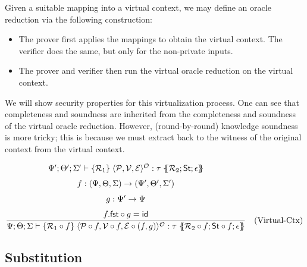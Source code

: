 \begin{definition}
    \label{def:virtual_oracle_reduction}
    Given a suitable mapping into a virtual context, we may define an oracle reduction via the following construction:
    \begin{itemize}
        \item The prover first applies the mappings to obtain the virtual context. The verifier does the same, but only for the non-private inputs.
        \item The prover and verifier then run the virtual oracle reduction on the virtual context.
    \end{itemize}
\end{definition}

We will show security properties for this virtualization process. One can see that completeness and soundness are inherited from the completeness and soundness of the virtual oracle reduction. However, (round-by-round) knowledge soundness is more tricky; this is because we must extract back to the witness of the original context from the virtual context.


\[
\frac{%
  \begin{array}{c}
    \Psi'; \Theta'; \Sigma' \vdash \{\mathcal{R}_1\} \; \langle\mathcal{P}, \mathcal{V}, \mathcal{E}\rangle^{\mathcal{O}} : \tau \; \{\!\!\{\mathcal{R}_2; \mathsf{St}; \epsilon\}\!\!\} \\[1.5ex]
    f : (\Psi, \Theta, \Sigma) \to (\Psi', \Theta', \Sigma') \\[1.5ex]
    g : \Psi' \to \Psi \\[1.5ex]
    f.\mathsf{fst} \circ g = \mathsf{id}
  \end{array}%
}{%
  \Psi; \Theta; \Sigma \vdash \{\mathcal{R}_1 \circ f\} \; \langle\mathcal{P} \circ f, \mathcal{V} \circ f, \mathcal{E} \circ (f, g)\rangle^{\mathcal{O}} : \tau \; \{\!\!\{\mathcal{R}_2 \circ f; \mathsf{St} \circ f; \epsilon\}\!\!\}
} \quad \text{(Virtual-Ctx)}
\]

\subsection{Substitution}

